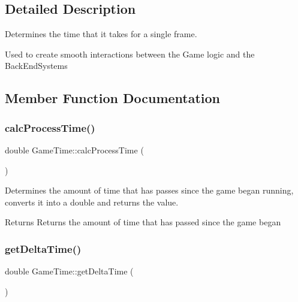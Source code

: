 \subsection{Detailed Description}
Determines the time that it takes for a single frame. 

Used to create smooth interactions between the Game logic and the Back\+End\+Systems 

\subsection{Member Function Documentation}
\mbox{\label{class_game_time_ac8a380f740f5bc39e98fda3e069c0bb3}} 
\subsubsection{\texorpdfstring{calc\+Process\+Time()}{calcProcessTime()}}
{\footnotesize\ttfamily double Game\+Time\+::calc\+Process\+Time (\begin{DoxyParamCaption}{ }\end{DoxyParamCaption})\hspace{0.3cm}{\ttfamily [private]}}



Determines the amount of time that has passes since the game began running, converts it into a double and returns the value. 

\begin{DoxyReturn}{Returns}
Returns the amount of time that has passed since the game began 
\end{DoxyReturn}
\mbox{\label{class_game_time_aa5ea84c887116ef68d1331617c5a81c3}} 
\subsubsection{\texorpdfstring{get\+Delta\+Time()}{getDeltaTime()}}
{\footnotesize\ttfamily double Game\+Time\+::get\+Delta\+Time (\begin{DoxyParamCaption}{ }\end{DoxyParamCaption})\hspace{0.3cm}{\ttfamily [static]}}




